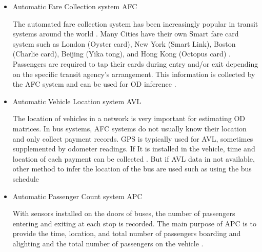 \documentclass[11pt,twoside]{article}
\numberwithin{equation}{section}
\newcommand{\?}{\stackrel{?}{=}}
\begin{document}
\begin{itemize}
\item Automatic Fare Collection system AFC

The automated fare collection system has been increasingly popular in transit systems around the world \citep{huangMethodBusOD2020}. Many Cities have their own Smart fare card system such as London (Oyster card), New York (Smart Link), Boston (Charlie card), Beijing (Yika tong), and Hong Kong (Octopus card) \citep{zannatEmergingBigData2019}. Passengers are required to tap their cards during entry and/or exit depending on the specific transit agency's arrangement. This information is collected by the AFC system and can be used for OD inference \citep{cuiBusPassengerOriginDestination2006}.


\item Automatic Vehicle Location system AVL

The location of vehicles in a network is very important for estimating OD matrices. In bus systems, AFC systems do not usually know their location and only collect payment records. GPS is typically used for AVL, sometimes supplemented by odometer readings\citep{vanderwaartPlanningTransitNetworks2016}. If It is installed in the vehicle, time and location of each payment can be collected  \citep{cuiBusPassengerOriginDestination2006}\citep{zannatEmergingBigData2019}. But if AVL data in not available, other method to infer the location of the bus are used such as using the bus schedule \citep{cuiBusPassengerOriginDestination2006}




\item Automatic Passenger Count system APC

With sensors installed on the doors of buses, the number of passengers entering and exiting at each stop is recorded. The main purpose of APC is to provide the time, location, and total number of passengers boarding and alighting and the total number of passengers on the vehicle \citep{vanderwaartPlanningTransitNetworks2016} \citep{cuiBusPassengerOriginDestination2006}. 


\end{itemize}
\end{document}
